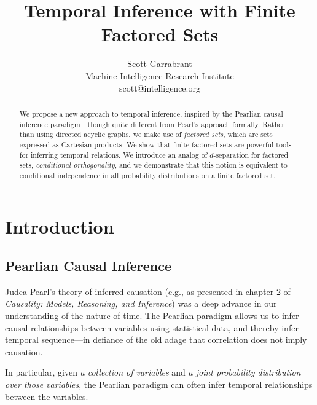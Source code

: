 \documentclass[authordate,onecolumn]{miri-tech-article}
\title{Temporal Inference with Finite Factored Sets}
\author{Scott Garrabrant \\ Machine Intelligence Research Institute \\ scott@intelligence.org}
\begin{document}

\newcommand{\du}[1]{\bigsqcup(#1)}
\newcommand{\pr}[1]{\bigsqcap(#1)}
\newcommand{\ortho}[3][F]{#2\mathbin{\perp^{#1}}#3}
\newcommand{\co}[4][F]{#2\mathbin{\perp^{#1}}#3\mid #4}
\newcommand{\cod}[4][D]{#2\mathbin{\perp_{#1}}#3\mid #4}
\newcommand{\ncod}[4][D]{#2\mathbin{\rightleftharpoons_{#1}}#3\mid #4}
\newcommand{\coc}[5][F]{#2\mathbin{\perp^{#1}_{#5}}#3\mid #4}
\newcommand{\parts}[1][S]{\text{Part}(#1)}
\maketitle
\begin{abstract}
We propose a new approach to temporal inference, inspired by the Pearlian causal inference paradigm---though quite different from Pearl's approach formally. Rather than using directed acyclic graphs, we make use of \emph{factored sets}, which are sets expressed as Cartesian products. We show that finite factored sets are powerful tools for inferring temporal relations. We introduce an analog of $d$-separation for factored sets, \emph{conditional orthogonality}, and we demonstrate that this notion is equivalent to conditional independence in all probability distributions on a finite factored set.
\end{abstract}

\tableofcontents

\vspace{25mm}

\section{Introduction}
\subsection{Pearlian Causal Inference}
Judea Pearl's theory of inferred causation (e.g., as presented in chapter 2 of \emph{Causality: Models, Reasoning, and Inference}) was a deep advance in our understanding of the nature of time. The Pearlian paradigm allows us to infer causal relationships between variables using statistical data, and thereby infer temporal sequence---in defiance of the old adage that correlation does not imply causation.\nocite{Pearl:2000}

In particular, given \emph{a collection of variables} and \emph{a joint probability distribution over those variables}, the Pearlian paradigm can often infer temporal relationships between the variables.
\end{document}
